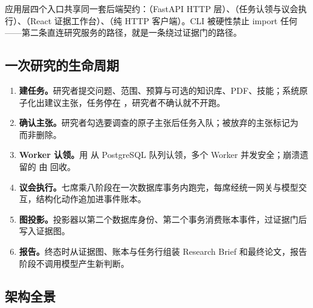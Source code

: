 应用层四个入口共享同一套后端契约：（FastAPI HTTP 层）、（任务认领与议会执行）、（React 证据工作台）、（纯 HTTP 客户端）。CLI 被硬性禁止 import 任何 ——第二条直连研究服务的路径，就是一条绕过证据门的路径。

\subsection{一次研究的生命周期}

\begin{enumerate}[leftmargin=1.6em, itemsep=3pt]
\item \textbf{建任务。}研究者提交问题、范围、预算与可选的知识库、PDF、技能；系统原子化出建议主张，任务停在 ，研究者不确认就不开跑。
\item \textbf{确认主张。}研究者勾选要调查的原子主张后任务入队；被放弃的主张标记为  而非删除。
\item \textbf{Worker 认领。}用  从 PostgreSQL 队列认领，多个 Worker 并发安全；崩溃遗留的  由  回收。
\item \textbf{议会执行。}七席乘八阶段在一次数据库事务内跑完，每席经统一网关与模型交互，结构化动作追加进事件账本。
\item \textbf{图投影。}投影器以第二个数据库身份、第二个事务消费账本事件，过证据门后写入证据图。
\item \textbf{报告。}终态时从证据图、账本与任务行组装 Research Brief 和最终论文，报告阶段不调用模型产生新判断。
\end{enumerate}

\subsection{架构全景}

